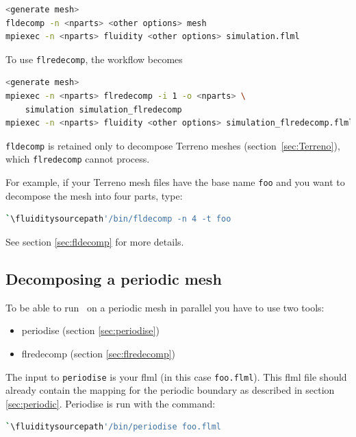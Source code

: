 \begin{lstlisting}[language=bash]
<generate mesh>
fldecomp -n <nparts> <other options> mesh
mpiexec -n <nparts> fluidity <other options> simulation.flml
\end{lstlisting}

To use \lstinline[language=bash]+flredecomp+, the workflow becomes

\begin{lstlisting}[language=bash]
<generate mesh>
mpiexec -n <nparts> flredecomp -i 1 -o <nparts> \
    simulation simulation_flredecomp
mpiexec -n <nparts> fluidity <other options> simulation_flredecomp.flml
\end{lstlisting}

\lstinline[language=bash]+fldecomp+ is retained only to decompose Terreno meshes (section~\ref{sec:Terreno}), which \lstinline[language=bash]+flredecomp+ cannot process.

For example, if your Terreno mesh files have the base name \lstinline[language=bash]+foo+ and you want to decompose the mesh into four parts, type:
\begin{lstlisting}[language = Bash]
`\fluiditysourcepath'/bin/fldecomp -n 4 -t foo
\end{lstlisting}
See section \ref{sec:fldecomp} for more details.

\subsection{Decomposing a periodic mesh}
\label{sec:decomposing_meshes_periodise}

To be able to run \fluidity\ on a periodic mesh in parallel you have to use
two tools:

\begin{itemize}
\item periodise (section \ref{sec:periodise})
\item flredecomp (section \ref{sec:flredecomp})
\end{itemize}

The input to \lstinline+periodise+ is your flml (in this case
\lstinline{foo.flml}). This flml file should already contain the mapping for
the periodic boundary as described in section
\ref{sec:periodic}. Periodise is run with the command:

\begin{lstlisting}[language=bash]
`\fluiditysourcepath'/bin/periodise foo.flml
\end{lstlisting}

